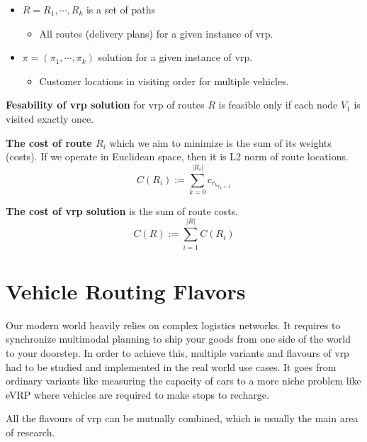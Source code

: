 \begin{itemize}
\begin{itemize}
        \end{itemize}
        \item $R = R_1, \cdots, R_k$ is a set of paths
        \begin{itemize}
            \item All routes (delivery plans) for a given instance of \gls{vrp}.
        \end{itemize}
        \item $\pi = (\pi_1, \cdots, \pi_k)$ solution for a given instance of \gls{vrp}.
        \begin{itemize}
            \item Customer locations in visiting order for multiple vehicles.
        \end{itemize}
    \end{itemize}
    
    \textbf{Fesability of \gls{vrp} solution} for \gls{vrp} of routes $R$ is feasible only if each node $V_1$ is visited exactly once.
    
    \textbf{The cost of route $R_i$} which we aim to minimize is the sum of its weights (costs). If we operate in Euclidean space, then it is L2 norm of route locations.
    \begin{equation}
        C(R_i) := \sum_{k = 0}^{|R_i|} c_{r_k}_{r_k+1}
    \end{equation}
    
    \textbf{The cost of \gls{vrp} solution} is the sum of route costs.
    \begin{equation}
        C(R) := \sum_{i = 1}^{|R|} C(R_i)
    \end{equation}
    
\section{Vehicle Routing Flavors}
Our modern world heavily relies on complex logistics networks. It requires to synchronize multimodal planning to ship your goods from one side of the world to your doorstep. In order to achieve this, multiple variants and flavours of \gls{vrp} had to be studied and implemented in the real world use cases. It goes from ordinary variants like measuring the capacity of cars to a more niche problem like eVRP where vehicles are required to make stops to recharge.

All the flavours of \gls{vrp} can be mutually combined, which is usually the main area of research.

